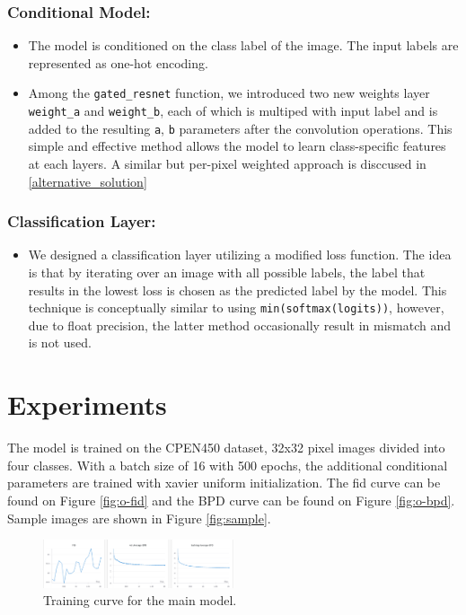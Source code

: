 \documentclass{article}
\begin{document}
    \subsubsection{Conditional Model:}
    \begin{itemize}
        \item The model is conditioned on the class label of the image. The input labels are represented as one-hot encoding.
        \item Among the \texttt{gated\_resnet} function, we introduced two new weights layer \texttt{weight\_a} and \texttt{weight\_b}, each of which is multiped with input label and is added to the resulting \texttt{a}, \texttt{b} parameters after the convolution operations. This simple and effective method allows the model to learn class-specific features at each layers. A similar but per-pixel weighted approach is disccused in \ref{alternative_solution}
     \end{itemize}

    \subsubsection{Classification Layer:}
    \begin{itemize}
        \item We designed a classification layer utilizing a modified loss function. The idea is that by iterating over an image with all possible labels, the label that results in the lowest loss is chosen as the predicted label by the model. This technique is conceptually similar to using \texttt{min(softmax(logits))}, however, due to float precision, the latter method occasionally result in mismatch and is not used.
    \end{itemize}

\section{Experiments}
The model is trained on the CPEN450 dataset, 32x32 pixel images divided into four classes. With a batch size of 16 with 500 epochs, the additional conditional parameters are trained with xavier uniform initialization. The fid curve can be found on Figure \ref{fig:o-fid} and the BPD curve can be found on Figure \ref{fig:o-bpd}.
Sample images are shown in Figure \ref{fig:sample}.

\begin{figure}
    \centering
    \includegraphics[width=0.5\textwidth]{report_data/o-train.png}
    \caption{ Training curve for the main model.}
    \label{fig:o-train}
  \end{figure}
\end{document}
